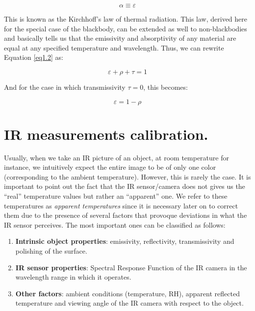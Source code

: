 		\begin{equation}\label{eq1.5}
			\alpha \equiv \varepsilon
		\end{equation}\bigskip	
		
		This is known as the Kirchhoff’s law of thermal radiation. This law, derived here for the special case of the blackbody, can be extended as well to non-blackbodies and basically tells us that the emissivity and absorptivity of any material are equal at any specified temperature and wavelength. Thus, we can rewrite Equation \ref{eq1.2} as:
		
		\begin{equation}\label{eq1.6}
			\varepsilon + \rho + \tau = 1
		\end{equation}\bigskip	
	
		And for the case in which transmissivity $\tau=0$, this becomes:
		
		\begin{equation}\label{eq1.7}
			\varepsilon = 1 - \rho
		\end{equation}\bigskip	
	
	\section{IR measurements calibration.}\label{section1.4}
	
		Usually, when we take an IR picture of an object, at room temperature for instance, we intuitively expect the entire image to be of only one color (corresponding to the ambient temperature). However, this is rarely the case. It is important to point out the fact that the IR sensor/camera does not gives us the “real” temperature values but rather an “apparent” one. We refer to these temperatures as \textit{apparent temperatures} since it is necessary later on to correct them due to the presence of several factors that provoque deviations in what the IR sensor perceives. The most important ones can be classified as follows:

		\begin{enumerate}[label={\arabic*.}]
			\item \textbf{Intrinsic object properties}: emissivity, reflectivity, transmissivity and polishing of the surface.
			\item \textbf{IR sensor properties}: Spectral Response Function of the IR camera in the wavelength range in which it operates.
			\item \textbf{Other factors}: ambient conditions (temperature, RH), apparent reflected temperature and viewing angle of the IR camera with respect to the object.
		\end{enumerate}
		

